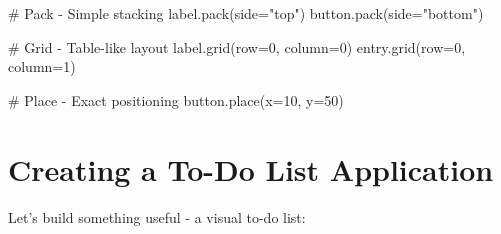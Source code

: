 \documentclass[
  letterpaper,
  DIV=11,
  numbers=noendperiod,
  oneside]{scrreprt}
\newenvironment{Shaded}{}{}
\newcommand{\CommentTok}[1]{\textcolor[rgb]{0.42,0.45,0.49}{#1}}
\newcommand{\DecValTok}[1]{\textcolor[rgb]{0.00,0.36,0.77}{#1}}
\newcommand{\NormalTok}[1]{\textcolor[rgb]{0.14,0.16,0.18}{#1}}
\newcommand{\OperatorTok}[1]{\textcolor[rgb]{0.14,0.16,0.18}{#1}}
\newcommand{\StringTok}[1]{\textcolor[rgb]{0.01,0.18,0.38}{#1}}
\begin{document}
\begin{Shaded}
\begin{Highlighting}[]
\CommentTok{\# Pack {-} Simple stacking}
\NormalTok{label.pack(side}\OperatorTok{=}\StringTok{"top"}\NormalTok{)}
\NormalTok{button.pack(side}\OperatorTok{=}\StringTok{"bottom"}\NormalTok{)}

\CommentTok{\# Grid {-} Table{-}like layout}
\NormalTok{label.grid(row}\OperatorTok{=}\DecValTok{0}\NormalTok{, column}\OperatorTok{=}\DecValTok{0}\NormalTok{)}
\NormalTok{entry.grid(row}\OperatorTok{=}\DecValTok{0}\NormalTok{, column}\OperatorTok{=}\DecValTok{1}\NormalTok{)}

\CommentTok{\# Place {-} Exact positioning}
\NormalTok{button.place(x}\OperatorTok{=}\DecValTok{10}\NormalTok{, y}\OperatorTok{=}\DecValTok{50}\NormalTok{)}
\end{Highlighting}
\end{Shaded}

\section{Creating a To-Do List
Application}\label{creating-a-to-do-list-application}

Let's build something useful - a visual to-do list:
\end{document}
